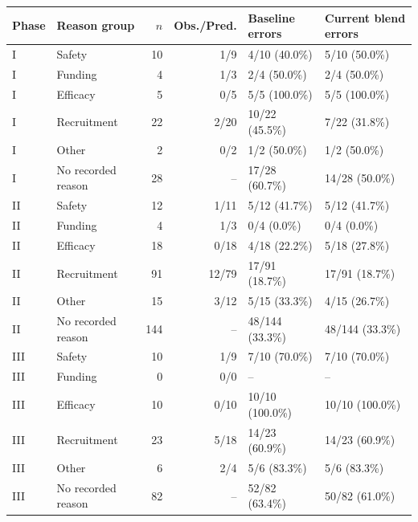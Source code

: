 \begin{tabular}{llrrll}
\toprule
Phase & Reason group & $n$ & Obs./Pred. & Baseline errors & Current blend errors \\
\midrule
I & Safety & 10 & 1/9 & 4/10 (40.0\%) & 5/10 (50.0\%) \\
I & Funding & 4 & 1/3 & 2/4 (50.0\%) & 2/4 (50.0\%) \\
I & Efficacy & 5 & 0/5 & 5/5 (100.0\%) & 5/5 (100.0\%) \\
I & Recruitment & 22 & 2/20 & 10/22 (45.5\%) & 7/22 (31.8\%) \\
I & Other & 2 & 0/2 & 1/2 (50.0\%) & 1/2 (50.0\%) \\
I & No recorded reason & 28 & -- & 17/28 (60.7\%) & 14/28 (50.0\%) \\
\midrule
II & Safety & 12 & 1/11 & 5/12 (41.7\%) & 5/12 (41.7\%) \\
II & Funding & 4 & 1/3 & 0/4 (0.0\%) & 0/4 (0.0\%) \\
II & Efficacy & 18 & 0/18 & 4/18 (22.2\%) & 5/18 (27.8\%) \\
II & Recruitment & 91 & 12/79 & 17/91 (18.7\%) & 17/91 (18.7\%) \\
II & Other & 15 & 3/12 & 5/15 (33.3\%) & 4/15 (26.7\%) \\
II & No recorded reason & 144 & -- & 48/144 (33.3\%) & 48/144 (33.3\%) \\
\midrule
III & Safety & 10 & 1/9 & 7/10 (70.0\%) & 7/10 (70.0\%) \\
III & Funding & 0 & 0/0 & -- & -- \\
III & Efficacy & 10 & 0/10 & 10/10 (100.0\%) & 10/10 (100.0\%) \\
III & Recruitment & 23 & 5/18 & 14/23 (60.9\%) & 14/23 (60.9\%) \\
III & Other & 6 & 2/4 & 5/6 (83.3\%) & 5/6 (83.3\%) \\
III & No recorded reason & 82 & -- & 52/82 (63.4\%) & 50/82 (61.0\%) \\
\bottomrule
\end{tabular}
